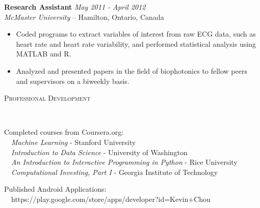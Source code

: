 \documentclass[9pt]{article}
\newenvironment{changemargin}[2]{%
  \begin{list}{}{%
    \setlength{\topsep}{0pt}%
    \setlength{\leftmargin}{#1}%
    \setlength{\rightmargin}{#2}%
    \setlength{\listparindent}{\parindent}%
    \setlength{\itemindent}{\parindent}%
    \setlength{\parsep}{\parskip}%
  }%
  \item[]}{\end{list}
}
\newcommand{\lineover}{
  \begin{changemargin}{-0.05in}{-0.05in}
    \vspace*{-8pt}
    \hrulefill \\
    \vspace*{-2pt}
  \end{changemargin}
}
\newcommand{\header}[1]{
  \begin{changemargin}{-0.5in}{-0.5in}
    {\large \scshape{#1}}\\
    \lineover
  \end{changemargin}
}
\newenvironment{body} {
  \vspace*{-16pt}
  \begin{changemargin}{-0.25in}{-0.5in}
  }
  {\end{changemargin}
}
\begin{document}
\begin{body}
  \textbf {Research Assistant} \hfill \emph{May 2011 - April 2012}\\
  \emph{McMaster University} -- Hamilton, Ontario, Canada
  \vspace*{-4pt}
  \begin{itemize} \itemsep -0pt
    \item Coded programs to extract variables of interest from raw ECG data, such
      as heart rate and heart rate variability, and performed statistical analysis
      using MATLAB and R.
    \item Analyzed and presented papers in the field of biophotonics to fellow
      peers and supervisors on a biweekly basis.
  \end{itemize}

\end{body}

\smallskip


\header{Professional Development}
\begin{body}
  \vspace{14pt}




  Completed courses from Coursera.org:\\
  \ \ \emph{Machine Learning} - Stanford University \\
  \ \ \emph{Introduction to Data Science} - University of Washington \\
  \ \ \emph{An Introduction to Interactive Programming in Python} - Rice University \\
  \ \ \emph{Computational Investing, Part I} - Georgia Institute of Technology

  \vspace{0.2cm}

  Published Android Applications:\\
  \ \ https://play.google.com/store/apps/developer?id=Kevin+Chou
\end{body}
\end{document}
